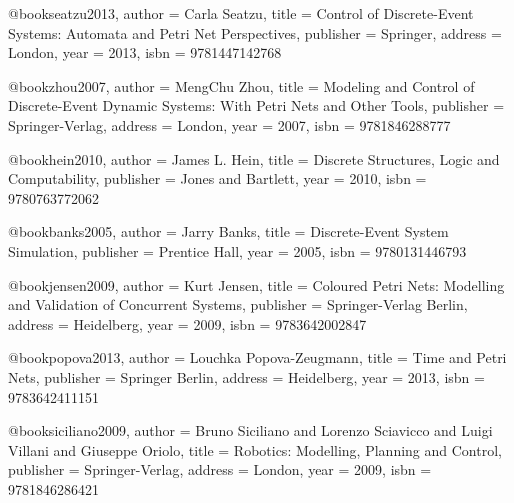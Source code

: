 @book{seatzu2013,
  author = {Carla Seatzu},
  title = {Control of Discrete-Event Systems: Automata and Petri Net Perspectives},
  publisher = {Springer},
  address = {London},
  year = {2013},
  isbn = {9781447142768}
}

@book{zhou2007,
  author = {MengChu Zhou},
  title = {Modeling and Control of Discrete-Event Dynamic Systems: With Petri Nets and Other Tools},
  publisher = {Springer-Verlag},
  address = {London},
  year = {2007},
  isbn = {9781846288777}
}

@book{hein2010,
  author = {James L. Hein},
  title = {Discrete Structures, Logic and Computability},
  publisher = {Jones and Bartlett},
  year = {2010},
  isbn = {9780763772062}
}

@book{banks2005,
  author = {Jarry Banks},
  title = {Discrete-Event System Simulation},
  publisher = {Prentice Hall},
  year = {2005},
  isbn = {9780131446793}
}

@book{jensen2009,
  author = {Kurt Jensen},
  title = {Coloured Petri Nets: Modelling and Validation of Concurrent Systems},
  publisher = {Springer-Verlag Berlin},
  address = {Heidelberg},
  year = {2009},
  isbn = {9783642002847}
}

@book{popova2013,
  author = {Louchka Popova-Zeugmann},
  title = {Time and Petri Nets},
  publisher = {Springer Berlin},
  address = {Heidelberg},
  year = {2013},
  isbn = {9783642411151}
}

%

@book{siciliano2009,
  author = {Bruno Siciliano and Lorenzo Sciavicco and Luigi Villani and Giuseppe Oriolo},
  title = {Robotics: Modelling, Planning and Control},
  publisher = {Springer-Verlag},
  address = {London},
  year = {2009},
  isbn = {9781846286421}
}

